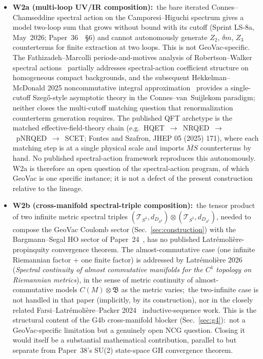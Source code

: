 \documentclass[11pt]{article}
\begin{document}
\begin{itemize}\setlength{\itemsep}{2pt}
\item \textbf{W2a (multi-loop UV/IR composition):}\ the bare
iterated Connes--Chamseddine spectral action on the
Camporesi--Higuchi spectrum gives a model two-loop sum that grows
without bound with its cutoff (Sprint LS-8a, May~2026;
Paper~36~\cite{paper36}~\S 6) and cannot autonomously generate $Z_2$,
$\delta m$, $Z_3$ counterterms for finite extraction at two loops.  This is not
GeoVac-specific.  The Fathizadeh--Marcolli periods-and-motives analysis of
Robertson--Walker spectral actions~\cite{fathizadeh_marcolli2016}
partially addresses spectral-action coefficient structure on
homogeneous compact backgrounds, and the subsequent Hekkelman--McDonald
2025 noncommutative integral approximation~\cite{hekkelman_mcdonald2024}
provides a single-cutoff Szeg\H{o}-style asymptotic theory in the
Connes--van~Suijlekom paradigm; neither closes the multi-cutoff
matching question that renormalization counterterm generation
requires.  The published QFT archetype is the matched effective-field-theory
chain (e.g.\ HQET~$\to$~NRQED~$\to$~pNRQED~$\to$~SCET; Fontes and
Szafron, JHEP 05 (2025) 171), where each matching step is at a single physical scale and
imports $\overline{MS}$ counterterms by hand.  No published spectral-action
framework reproduces this autonomously.  W2a is therefore an open
question of the spectral-action program, of which GeoVac is one
specific instance; it is not a defect of the present construction
relative to the lineage.

\item \textbf{W2b (cross-manifold spectral-triple composition):}\ the
tensor product of two infinite metric spectral triples
$(\mathcal{T}_{S^3}, d_{D_{S^3}}) \otimes (\mathcal{T}_{S^5}, d_{D_{S^5}})$,
needed to compose the GeoVac Coulomb sector (Sec.~\ref{sec:construction})
with the Bargmann--Segal HO sector of Paper~24~\cite{paper24}, has no
published Latr\'emoli\`ere-propinquity convergence theorem.  The
almost-commutative case (one infinite Riemannian factor + one finite
factor) is addressed by Latr\'emoli\`ere 2026~\cite{latremoliere2026}
(\emph{Spectral continuity of almost commutative manifolds for the
$C^1$ topology on Riemannian metrics}), in the sense of metric
continuity of almost-commutative models $C(M) \otimes \mathfrak{B}$ as
the metric varies;\ the two-infinite case is not handled in that
paper (implicitly, by its construction), nor in the closely related
Farsi--Latr\'emoli\`ere--Packer 2024~\cite{farsi_latremoliere_packer2024} inductive-sequence work.  This is the structural content of the G4b cross-manifold
blocker (Sec.~\ref{sec:g4}):\ not a GeoVac-specific limitation but a
genuinely open NCG question.  Closing it would itself be a substantial
mathematical contribution, parallel to but separate from Paper~38's
SU(2) state-space GH convergence theorem.
\end{itemize}
\end{document}
